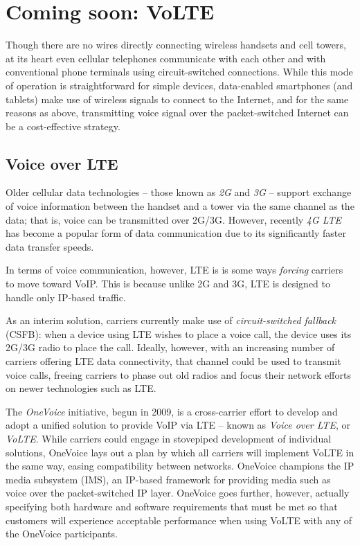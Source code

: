 \documentclass[11pt]{article}
\newcommand{\term}[1]{\textit{#1}}
\begin{document}
\section{Coming soon: VoLTE}

Though there are no wires directly connecting wireless handsets and cell towers,
at its heart even cellular telephones communicate with each other and with
conventional phone terminals using circuit-switched connections. While this mode
of operation is straightforward for simple devices, data-enabled smartphones
(and tablets) make use of wireless signals to connect to the Internet, and for
the same reasons as above, transmitting voice signal over the packet-switched
Internet can be a cost-effective strategy.

\subsection{Voice over LTE}

Older cellular data technologies -- those known as \term{2G} and \term{3G} --
support exchange of voice information between the handset and a tower via the
same channel as the data; that is, voice can be transmitted over 2G/3G. However,
recently \term{4G LTE} has become a popular form of data communication due to
its significantly faster data transfer speeds. \cite{volte_book}

In terms of voice communication, however, LTE is is some ways \emph{forcing}
carriers to move toward VoIP. This is because unlike 2G and 3G, LTE is designed
to handle only IP-based traffic. \cite{3gpp}

As an interim solution, carriers currently make use of \term{circuit-switched
fallback} (CSFB): when a device using LTE wishes to place a voice call, the
device uses its 2G/3G radio to place the call. \cite{volte_book} Ideally,
however, with an increasing number of carriers offering LTE data connectivity,
that channel could be used to transmit voice calls, freeing carriers to phase
out old radios and focus their network efforts on newer technologies such as
LTE.

The \term{OneVoice} initiative, begun in 2009, is a cross-carrier effort to
develop and adopt a unified solution to provide VoIP via LTE -- known as
\term{Voice over LTE}, or \term{VoLTE}.  While carriers could engage in
stovepiped development of individual solutions, OneVoice lays out a plan by
which all carriers will implement VoLTE in the same way, easing compatibility
between networks. OneVoice champions the IP media subsystem (IMS), an IP-based
framework for providing media such as voice over the packet-switched IP layer.
OneVoice goes further, however, actually specifying both hardware and software
requirements that must be met so that customers will experience acceptable
performance when using VoLTE with any of the OneVoice participants.
\cite{volte_book}
\end{document}
